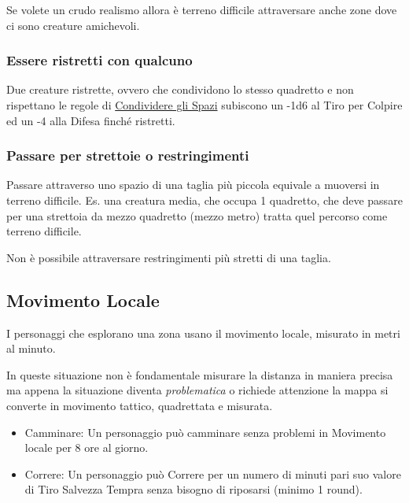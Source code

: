 \begin{multicols}{2}
\begin{narratore}
Se volete un crudo realismo allora è terreno difficile attraversare anche zone dove ci sono creature amichevoli. \end{narratore}

\subsubsection{Essere ristretti con qualcuno}
Due creature ristrette, ovvero che condividono lo stesso quadretto e non rispettano le regole di \hyperlink{condividereglispazi}{Condividere gli Spazi} subiscono un -1d6 al Tiro per Colpire ed un -4 alla Difesa finché ristretti.\hypertarget{ristretti}{}\label{ristretti}

\subsubsection{Passare per strettoie o restringimenti}

Passare attraverso uno spazio di una taglia più piccola equivale a muoversi in terreno difficile. Es. una creatura media, che occupa 1 quadretto, che deve passare per una strettoia da mezzo quadretto (mezzo metro) tratta quel percorso come terreno difficile.

Non è possibile attraversare restringimenti più stretti di una taglia.

\subsection{Movimento Locale}\label{movimentolocale}

I personaggi che esplorano una zona usano il movimento locale, misurato in metri al minuto.

In queste situazione non è fondamentale misurare la distanza in maniera precisa ma appena la situazione diventa \emph{problematica} o richiede attenzione la mappa si converte in movimento tattico, quadrettata e misurata.

\begin{itemize}[leftmargin=*] \setlength{\itemsep}{0pt}
\item
Camminare: Un personaggio può camminare senza problemi in Movimento locale per 8 ore al giorno.
\item
Correre: Un personaggio può Correre per un numero di minuti pari suo valore di Tiro Salvezza Tempra senza bisogno di riposarsi (minimo 1 round).
\end{itemize}


\end{multicols}
